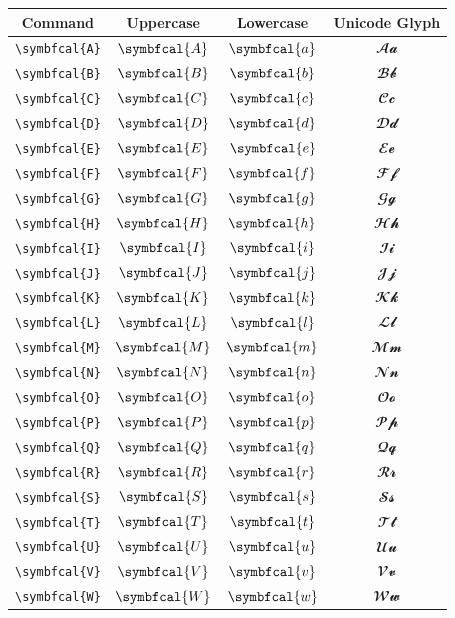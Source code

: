 \documentclass[12pt,a4paper]{article}
\begin{document}
\begin{longtable}{|c|c|c|c|}
\hline
\textbf{Command} & \textbf{Uppercase} & \textbf{Lowercase} & \textbf{Unicode Glyph} \\
\hline
\verb|\symbfcal{A}| & $\symbfcal{A}$ & $\symbfcal{a}$ & $ 𝓐 𝓪 $ \\
\verb|\symbfcal{B}| & $\symbfcal{B}$ & $\symbfcal{b}$ & $ 𝓑 𝓫 $ \\
\verb|\symbfcal{C}| & $\symbfcal{C}$ & $\symbfcal{c}$ & $ 𝓒 𝓬 $ \\
\verb|\symbfcal{D}| & $\symbfcal{D}$ & $\symbfcal{d}$ & $ 𝓓 𝓭 $ \\
\verb|\symbfcal{E}| & $\symbfcal{E}$ & $\symbfcal{e}$ & $ 𝓔 𝓮 $ \\
\verb|\symbfcal{F}| & $\symbfcal{F}$ & $\symbfcal{f}$ & $ 𝓕 𝓯 $ \\
\verb|\symbfcal{G}| & $\symbfcal{G}$ & $\symbfcal{g}$ & $ 𝓖 𝓰 $ \\
\verb|\symbfcal{H}| & $\symbfcal{H}$ & $\symbfcal{h}$ & $ 𝓗 𝓱 $ \\
\verb|\symbfcal{I}| & $\symbfcal{I}$ & $\symbfcal{i}$ & $ 𝓘 𝓲 $ \\
\verb|\symbfcal{J}| & $\symbfcal{J}$ & $\symbfcal{j}$ & $ 𝓙 𝓳 $ \\
\verb|\symbfcal{K}| & $\symbfcal{K}$ & $\symbfcal{k}$ & $ 𝓚 𝓴 $ \\
\verb|\symbfcal{L}| & $\symbfcal{L}$ & $\symbfcal{l}$ & $ 𝓛 𝓵 $ \\
\verb|\symbfcal{M}| & $\symbfcal{M}$ & $\symbfcal{m}$ & $ 𝓜 𝓶 $ \\
\verb|\symbfcal{N}| & $\symbfcal{N}$ & $\symbfcal{n}$ & $ 𝓝 𝓷 $ \\
\verb|\symbfcal{O}| & $\symbfcal{O}$ & $\symbfcal{o}$ & $ 𝓞 𝓸 $ \\
\verb|\symbfcal{P}| & $\symbfcal{P}$ & $\symbfcal{p}$ & $ 𝓟 𝓹 $ \\
\verb|\symbfcal{Q}| & $\symbfcal{Q}$ & $\symbfcal{q}$ & $ 𝓠 𝓺 $ \\
\verb|\symbfcal{R}| & $\symbfcal{R}$ & $\symbfcal{r}$ & $ 𝓡 𝓻 $ \\
\verb|\symbfcal{S}| & $\symbfcal{S}$ & $\symbfcal{s}$ & $ 𝓢 𝓼 $ \\
\verb|\symbfcal{T}| & $\symbfcal{T}$ & $\symbfcal{t}$ & $ 𝓣 𝓽 $ \\
\verb|\symbfcal{U}| & $\symbfcal{U}$ & $\symbfcal{u}$ & $ 𝓤 𝓾 $ \\
\verb|\symbfcal{V}| & $\symbfcal{V}$ & $\symbfcal{v}$ & $ 𝓥 𝓿 $ \\
\verb|\symbfcal{W}| & $\symbfcal{W}$ & $\symbfcal{w}$ & $ 𝓦 𝔀 $ \\

\end{longtable}
\end{document}
